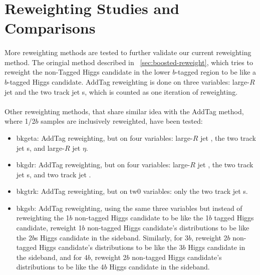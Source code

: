 \section{Reweighting Studies and Comparisons}
\label{app:reweightstudy}

\paragraph{}
More reweighting methods are tested to further validate our current reweighting method. The oringial method described in ~\ref{sec:boosted-reweight}, which tries to reweight the non-Tagged Higgs candidate in the lower $b$-tagged region to be like a $b$-tagged Higgs candidate. AddTag reweighting is done on three variables: large-$R$ jet \pt and the two track jet \pt s, which is counted as one iteration of reweighting.

\paragraph{}
Other reweighting methods, that share similar idea with the AddTag method, where 1/2$b$ samples are inclusively reweighted, have been tested:
\begin{itemize}
	\item bkgeta: AddTag reweighting, but on four variables: large-$R$ jet \pt, the two track jet \pt s, and large-$R$ jet $\eta$.
	\item bkgdr: AddTag reweighting, but on four variables: large-$R$ jet \pt, the two track jet \pt s, and two track jet \DR.
	\item bkgtrk: AddTag reweighting, but on tw0 variables: only the two track jet \pt s.
	\item bkgsb: AddTag reweighting, using the same three variables but instead of reweighting the 1$b$ non-tagged Higgs candidate to be like the 1$b$ tagged Higgs candidate, reweight 1$b$ non-tagged Higgs candidate's distributions to be like the 2$b$s Higgs candidate in the sideband. Similarly, for 3$b$, reweight 2$b$ non-tagged Higgs candidate's distributions to be like the 3$b$ Higgs candidate in the sideband, and for 4$b$, reweight 2$b$ non-tagged Higgs candidate's distributions to be like the 4$b$ Higgs candidate in the sideband.
\end{itemize}

